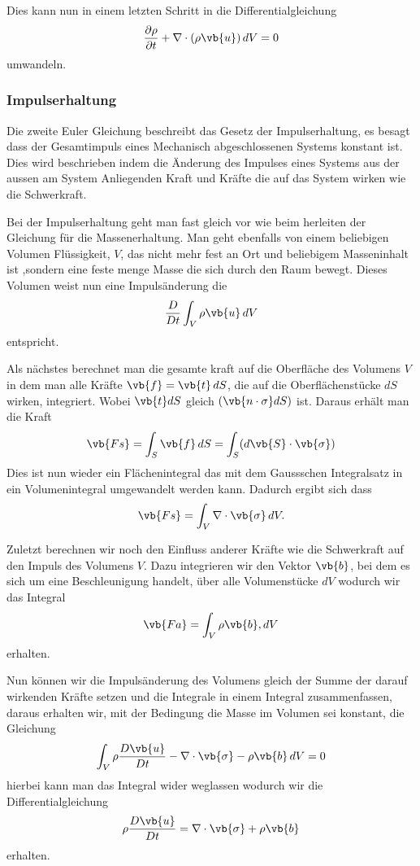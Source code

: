 Dies kann nun in einem letzten Schritt in die Differentialgleichung
\begin{equation}
\label{openfoam:euler1}
\frac{\partial \rho}{\partial t} + \nabla\cdot(\rho\vb{u})  \, dV 
= 
0
\end{equation}
umwandeln.

\subsubsection{Impulserhaltung}
Die zweite Euler Gleichung beschreibt das Gesetz der Impulserhaltung, es besagt dass der Gesamtimpuls eines Mechanisch abgeschlossenen Systems konstant ist.
Dies wird beschrieben indem die Änderung des Impulses eines Systems aus der aussen am System Anliegenden Kraft und Kräfte die auf das System wirken wie die Schwerkraft.

Bei der Impulserhaltung geht man fast gleich vor wie beim herleiten der Gleichung für die Massenerhaltung.
Man geht ebenfalls von einem beliebigen Volumen Flüssigkeit, $V$, das nicht mehr fest an Ort und beliebigem Masseninhalt ist ,sondern eine feste menge Masse die sich durch den Raum bewegt.
Dieses Volumen weist nun eine Impulsänderung die
\[\frac{D}{Dt}\int_{V}\rho\vb{u}\, dV\]
entspricht.

Als nächstes berechnet man die gesamte kraft auf die Oberfläche des Volumens $V$ in dem man alle Kräfte $\vb{f} = \vb{t}\,dS$, die auf die Oberflächenstücke $dS$ wirken, integriert.
Wobei $\vb{t} dS$ gleich $(\vb{n\cdot\sigma}dS)$ ist. 
Daraus erhält man die Kraft 
\[\vb{Fs} 
=
\int_{S}\vb{f}\, dS
= \int_{S} (d\vb{S}\cdot\vb{\sigma})
\]
Dies ist nun wieder ein Flächenintegral das mit dem Gaussschen Integralsatz in ein Volumenintegral umgewandelt werden kann.
Dadurch ergibt sich dass
\[\vb{Fs} 
=
\int_{V}\nabla \cdot \vb{\sigma}\, dV
.\]

Zuletzt berechnen wir noch den Einfluss anderer Kräfte wie die Schwerkraft auf den Impuls des Volumens $V$.
Dazu integrieren wir den Vektor $\vb{b}$, bei dem es sich um eine Beschleunigung handelt, über alle Volumenstücke $dV$ wodurch wir das Integral
\[\vb{Fa} 
=
\int_{V}\rho\vb{b}, dV
\]
erhalten.

Nun können wir die Impulsänderung des Volumens gleich der Summe der darauf wirkenden Kräfte setzen und die Integrale in einem Integral zusammenfassen, daraus erhalten wir, mit der Bedingung die Masse im Volumen sei konstant, die Gleichung 
\[\int_{V} \rho \frac{D\vb{u}}{Dt} - \nabla \cdot \vb{\sigma} -\rho \vb{b}\, dV
=
0
\]
hierbei kann man das Integral wider weglassen wodurch wir die Differentialgleichung
\begin{equation}
\label{openfoam:euler2_1}
\rho \frac{D\vb{u}}{Dt}
= 
\nabla \cdot \vb{\sigma} +\rho \vb{b}
\end{equation}
erhalten.

